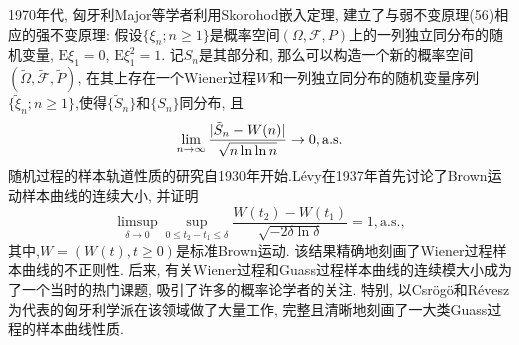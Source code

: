 1970年代, 匈牙利Major等学者利用Skorohod嵌入定理, 建立了与弱不变原理(56)相应的强不变原理: 假设$\{\xi_n;n\geqslant 1\}$是概率空间$(\Omega,\mathscr{F},P)$上的一列独立同分布的随机变量, $\mathrm{E}\xi_1= 0$, $\mathrm{E}\xi_1^2 = 1$. 记$S_n$是其部分和, 那么可以构造一个新的概率空间$(\tilde{\Omega},\tilde{\mathscr{F}},\tilde{P})$, 在其上存在一个Wiener过程$W$和一列独立同分布的随机变量序列$\{ \tilde{\xi}_n;n\geqslant 1 \}$,使得$\{\tilde{S}_n\}$和$\{S_n\}$同分布, 且\begin{equation}
\lim_{n\to\infty}\frac{\lvert\tilde{S}_n-W(n)\rvert}{\sqrt{n\ln\ln n}}\to 0 ,\mathrm{a.s.}
\end{equation}
随机过程的样本轨道性质的研究自1930年开始.Lévy在1937年首先讨论了Brown运动样本曲线的连续大小, 并证明\begin{equation}
\limsup_{\delta\to 0}\sup_{0\leqslant t_2-t_1\leqslant \delta}\frac{W(t_2)-W(t_1)}{\sqrt{-2\delta\ln\delta}} = 1,\mathrm{a.s.},
\end{equation}
其中,$W = (W(t),t\geqslant 0)$是标准Brown运动. 该结果精确地刻画了Wiener过程样本曲线的不正则性. 后来, 有关Wiener过程和Guass过程样本曲线的连续模大小成为了一个当时的热门课题, 吸引了许多的概率论学者的关注. 特别, 以Csrögö和Révesz为代表的匈牙利学派在该领域做了大量工作, 完整且清晰地刻画了一大类Guass过程的样本曲线性质.
